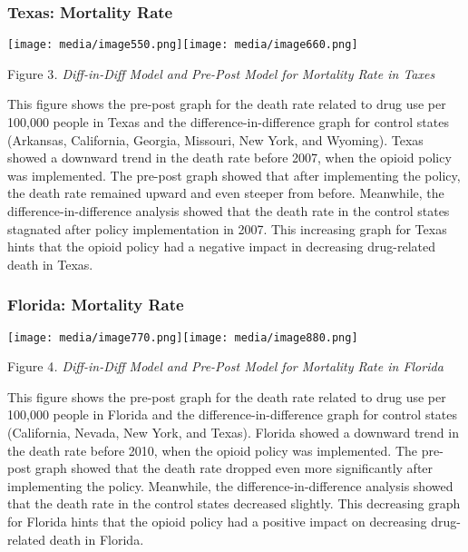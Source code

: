 \documentclass{article}
\begin{document}
\hypertarget{texas-mortality-rate}{%
\subsubsection{Texas: Mortality Rate}\label{texas-mortality-rate}}

\texttt{[image: media/image550.png]}\texttt{[image: media/image660.png]}

Figure 3\emph{. Diff-in-Diff Model and Pre-Post Model for Mortality Rate
in Taxes}

This figure shows the pre-post graph for the death rate related to drug
use per 100,000 people in Texas and the difference-in-difference graph
for control states (Arkansas, California, Georgia, Missouri, New York,
and Wyoming). Texas showed a downward trend in the death rate before
2007, when the opioid policy was implemented. The pre-post graph showed
that after implementing the policy, the death rate remained upward and
even steeper from before. Meanwhile, the difference-in-difference
analysis showed that the death rate in the control states stagnated
after policy implementation in 2007. This increasing graph for Texas
hints that the opioid policy had a negative impact in decreasing
drug-related death in Texas.

\hypertarget{florida-mortality-rate}{%
\subsubsection{Florida: Mortality Rate}\label{florida-mortality-rate}}

\texttt{[image: media/image770.png]}\texttt{[image: media/image880.png]}

Figure 4\emph{. Diff-in-Diff Model and Pre-Post Model for Mortality Rate
in Florida}

This figure shows the pre-post graph for the death rate related to drug
use per 100,000 people in Florida and the difference-in-difference graph
for control states (California, Nevada, New York, and Texas). Florida
showed a downward trend in the death rate before 2010, when the opioid
policy was implemented. The pre-post graph showed that the death rate
dropped even more significantly after implementing the policy.
Meanwhile, the difference-in-difference analysis showed that the death
rate in the control states decreased slightly. This decreasing graph for
Florida hints that the opioid policy had a positive impact on decreasing
drug-related death in Florida.
\end{document}

